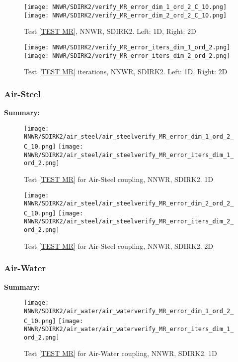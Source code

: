 \documentclass[a4paper,10pt]{article}
\begin{document}
\begin{figure}[!ht]
\texttt{[image: NNWR/SDIRK2/verify\_MR\_error\_dim\_1\_ord\_2\_C\_10.png]}
\texttt{[image: NNWR/SDIRK2/verify\_MR\_error\_dim\_2\_ord\_2\_C\_10.png]}
\caption{Test \ref{TEST MR}, NNWR, SDIRK2. Left: 1D, Right: 2D}
\label{FIG NNWR SDIRK2 MR ERROR}
\end{figure}

\begin{figure}[!ht]
\texttt{[image: NNWR/SDIRK2/verify\_MR\_error\_iters\_dim\_1\_ord\_2.png]}
\texttt{[image: NNWR/SDIRK2/verify\_MR\_error\_iters\_dim\_2\_ord\_2.png]}
\caption{Test \ref{TEST MR} iterations, NNWR, SDIRK2. Left: 1D, Right: 2D}
\label{FIG NNWR SDIRK2 MR ITERS}
\end{figure}

\FloatBarrier
\subsubsection{Air-Steel}\label{SEC NNWR SDIRK2 AIR STEEL}
%
\textbf{Summary:}

\begin{figure}[!ht]
\texttt{[image: NNWR/SDIRK2/air\_steel/air\_steelverify\_MR\_error\_dim\_1\_ord\_2\_C\_10.png]}
\texttt{[image: NNWR/SDIRK2/air\_steel/air\_steelverify\_MR\_error\_iters\_dim\_1\_ord\_2.png]}
\caption{Test \ref{TEST MR} for Air-Steel coupling, NNWR, SDIRK2. 1D}
\label{FIG NNWR SDIRK2 AIR STEEL 1D}
\end{figure}

\begin{figure}[!ht]
\texttt{[image: NNWR/SDIRK2/air\_steel/air\_steelverify\_MR\_error\_dim\_2\_ord\_2\_C\_10.png]}
\texttt{[image: NNWR/SDIRK2/air\_steel/air\_steelverify\_MR\_error\_iters\_dim\_2\_ord\_2.png]}
\caption{Test \ref{TEST MR} for Air-Steel coupling, NNWR, SDIRK2. 2D}
\label{FIG NNWR SDIRK2 AIR STEEL 2D}
\end{figure}

\FloatBarrier
\subsubsection{Air-Water}\label{SEC NNWR SDIRK2 AIR WATER}
% 
\textbf{Summary:}

\begin{figure}[!ht]
\texttt{[image: NNWR/SDIRK2/air\_water/air\_waterverify\_MR\_error\_dim\_1\_ord\_2\_C\_10.png]}
\texttt{[image: NNWR/SDIRK2/air\_water/air\_waterverify\_MR\_error\_iters\_dim\_1\_ord\_2.png]}
\caption{Test \ref{TEST MR} for Air-Water coupling, NNWR, SDIRK2. 1D}
\label{FIG NNWR SDIRK2 AIR WATER 1D}
\end{figure}
\end{document}
